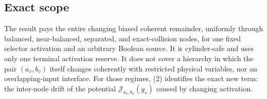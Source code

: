 \subsection*{Exact scope}

The result pays the entire changing biased coherent remainder, uniformly
through balanced, near-balanced, separated, and exact-collision nodes, for
one fixed selector activation and an arbitrary Boolean source.  It is
cylinder-safe and uses only one terminal activation reserve.  It does not
cover a hierarchy in which the pair $(a_v,b_v)$ itself changes coherently
with restricted physical variables, nor an overlapping-input interface.
For those regimes, (2) identifies the exact new term: the inter-node drift
of the potential $\mathcal J_{a_v,b_v}(g_v)$ caused by changing activation.

